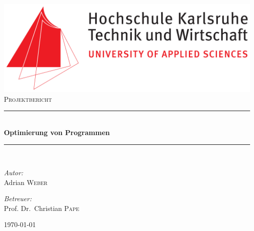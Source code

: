 \begin{titlepage}

	\begin{center}
		
		\includegraphics[width=\textwidth]{./img/hska-logo}\\[2.5cm]
		
		\textsc{\Large Projektbericht}\\[0.5cm]
		
		\newcommand{\HRule}{\rule{\linewidth}{0.5mm}}
		\HRule \\[0.4cm]
		{ \huge \bfseries Optimierung von Programmen}\\[0.4cm]
		
		\HRule \\[1.5cm]
		
		\begin{minipage}{0.4\textwidth}
		\begin{flushleft} \large
		\emph{Autor:}\\
		Adrian \textsc{Weber}
		\end{flushleft}
		\end{minipage}
		\hfill
		\begin{minipage}{0.4\textwidth}
		\begin{flushright} \large
		\emph{Betreuer:} \\
		Prof. Dr.~Christian \textsc{Pape}
		\end{flushright}
		\end{minipage}
		
		\vfill
		
		{\large \today}
		
	\end{center}
	
\end{titlepage}